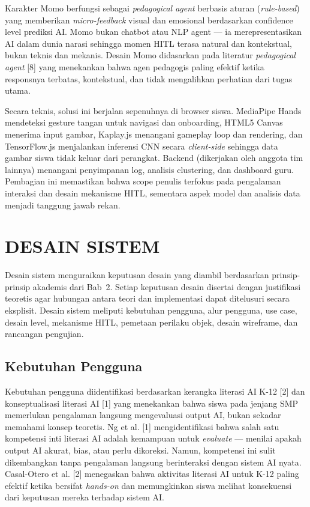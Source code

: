 \documentclass[12pt,oneside]{report}
\begin{document}
Karakter Momo berfungsi sebagai \textit{pedagogical agent} berbasis aturan (\textit{rule-based}) yang memberikan \textit{micro-feedback} visual dan emosional berdasarkan confidence level prediksi AI. Momo bukan chatbot atau NLP agent --- ia merepresentasikan AI dalam dunia narasi sehingga momen HITL terasa natural dan kontekstual, bukan teknis dan mekanis. Desain Momo didasarkan pada literatur \textit{pedagogical agent} [8] yang menekankan bahwa agen pedagogis paling efektif ketika responsnya terbatas, kontekstual, dan tidak mengalihkan perhatian dari tugas utama.

Secara teknis, solusi ini berjalan sepenuhnya di browser siswa. MediaPipe Hands mendeteksi gesture tangan untuk navigasi dan onboarding, HTML5 Canvas menerima input gambar, Kaplay.js menangani gameplay loop dan rendering, dan TensorFlow.js menjalankan inferensi CNN secara \textit{client-side} sehingga data gambar siswa tidak keluar dari perangkat. Backend (dikerjakan oleh anggota tim lainnya) menangani penyimpanan log, analisis clustering, dan dashboard guru. Pembagian ini memastikan bahwa scope penulis terfokus pada pengalaman interaksi dan desain mekanisme HITL, sementara aspek model dan analisis data menjadi tanggung jawab rekan.


\section{DESAIN SISTEM}
\label{sec:desain-sistem}

Desain sistem menguraikan keputusan desain yang diambil berdasarkan prinsip-prinsip akademis dari Bab~2. Setiap keputusan desain disertai dengan justifikasi teoretis agar hubungan antara teori dan implementasi dapat ditelusuri secara eksplisit. Desain sistem meliputi kebutuhan pengguna, alur pengguna, use case, desain level, mekanisme HITL, pemetaan perilaku objek, desain wireframe, dan rancangan pengujian.


\subsection{Kebutuhan Pengguna}
\label{subsec:kebutuhan-pengguna}

Kebutuhan pengguna diidentifikasi berdasarkan kerangka literasi AI K-12 [2] dan konseptualisasi literasi AI [1] yang menekankan bahwa siswa pada jenjang SMP memerlukan pengalaman langsung mengevaluasi output AI, bukan sekadar memahami konsep teoretis. Ng et al. [1] mengidentifikasi bahwa salah satu kompetensi inti literasi AI adalah kemampuan untuk \textit{evaluate} --- menilai apakah output AI akurat, bias, atau perlu dikoreksi. Namun, kompetensi ini sulit dikembangkan tanpa pengalaman langsung berinteraksi dengan sistem AI nyata. Casal-Otero et al. [2] menegaskan bahwa aktivitas literasi AI untuk K-12 paling efektif ketika bersifat \textit{hands-on} dan memungkinkan siswa melihat konsekuensi dari keputusan mereka terhadap sistem AI.
\end{document}
